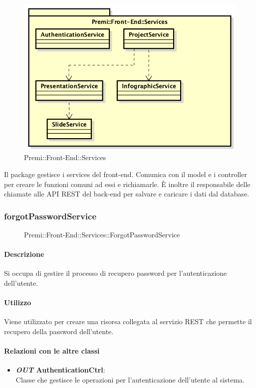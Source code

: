 \begin{figure}[h]
	\centering
	\includegraphics[width=0.7\linewidth]{img/premi_front_end_services}
	\caption[Premi::Front-End::Services]{Premi::Front-End::Services}
\end{figure}
Il package gestisce i services del front-end. Comunica con il model e i controller per creare le funzioni comuni ad essi e richiamarle. È inoltre il responsabile delle chiamate alle API REST del back-end per salvare e caricare i dati dal database.


\subsubsection{forgotPasswordService}
	\begin{figure}[h]
		\centering
		\caption[Premi::Front-End::Services::ForgotPasswordService]{Premi::Front-End::Services::ForgotPasswordService}
	\end{figure}
	
	\paragraph{Descrizione}
	Si occupa di gestire il processo di recupero password per l'autenticazione dell'utente.
	
	\paragraph{Utilizzo}
	Viene utilizzato per creare una risorsa collegata al servizio REST che permette il recupero della password dell'utente.
	
	\paragraph{Relazioni con le altre classi}
	\begin{itemize}
		\item \textbf{\textit{OUT} AuthenticationCtrl}:\\
			Classe che gestisce le operazioni per l'autenticazione dell'utente al sistema.
	\end{itemize}
	
